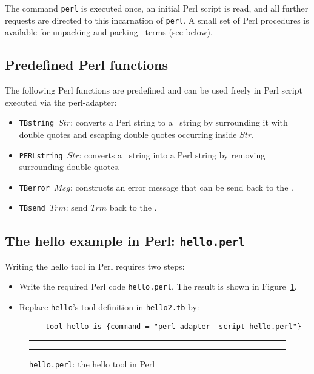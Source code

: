 \noindent The command {\tt perl} is executed once, an initial Perl script
is read, and all further requests are directed to this incarnation
of {\tt perl}. A small set of Perl procedures is available for
unpacking and packing \TB\ terms (see below).

\subsection{\label{Perl-functions}Predefined Perl functions}
The following Perl functions are predefined and can be used freely in Perl
script executed via the perl-adapter:
\begin{itemize}
\item {\tt TBstring $Str$\/}: converts a Perl string to a \TB\ string by
surrounding it with double quotes and escaping double quotes occurring
inside $Str$.

\item {\tt PERLstring $Str$\/}: converts a \TB\ string into  a Perl string
by removing surrounding double quotes.

\item {\tt TBerror $Msg$\/}: constructs an error message that can be send back
to the \TB.

\item {\tt TBsend $Trm$\/}: send $Trm$ back to the \TB.

\end{itemize}

\subsection{\label{Ex-hello.perl}The hello example in Perl: {\tt hello.perl}}

Writing the hello tool in Perl requires two steps:
\begin{itemize}
\item Write the required Perl code {\tt hello.perl}. The result is shown in Figure~\ref{fig:hello.perl}.
\item Replace {\tt hello}'s tool definition in {\tt hello2.tb} by:
\begin{verbatim}
      tool hello is {command = "perl-adapter -script hello.perl"}
\end{verbatim}
\end{itemize}


\begin{figure}
\rule{\textwidth}{0.5mm}

  \caption{{\tt hello.perl}: the hello tool in Perl}
  \label{fig:hello.perl}
\rule{\textwidth}{0.5mm}
\end{figure}
